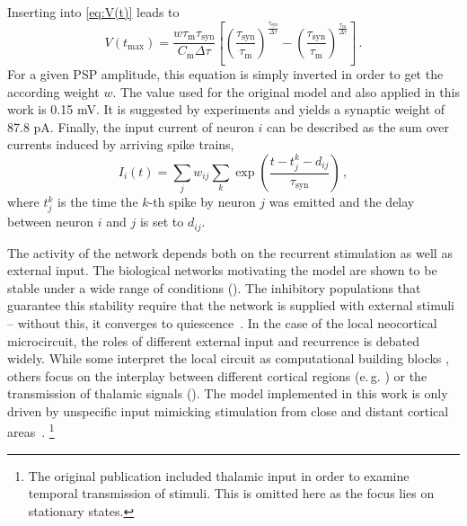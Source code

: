 Inserting into \autoref{eq:V(t)} leads to 
\begin{equation}
    V(t_\text{max}) 
        = \frac{w \tau_\text{m} \tau_\text{syn}}{C_\text{m} \Delta\tau}	
            \left[ 
                \left( \frac{\tau_\text{syn}}{\tau_\text{m}} \right)^\frac{\tau_\text{syn}}{\Delta\tau} 
            - \left( \frac{\tau_\text{syn}}{\tau_\text{m}} \right)^\frac{\tau_\text{m}}{\Delta\tau} 
            \right] \,.
    \label{eq:PSP}
\end{equation}
For a given PSP amplitude, this equation is simply inverted in order to get the according 
weight $w$. The value used for the original model and also applied in this work 
is 0.15 mV. It is suggested by experiments and yields 
a synaptic weight of 87.8 pA. 
Finally, the 
input current of neuron $i$ can be described as the sum over currents induced by
arriving spike trains, 
\begin{equation}
    I_i(t) = \sum_j w_{ij} \sum_k \exp\left(\frac{t - t_j^k - d_{ij}}{\tau_\text{syn}}\right) \, ,
    \label{eq:input_current}
\end{equation}
where $t_j^k$ is the time the $k$-th spike by neuron $j$ was emitted and the 
delay between neuron $i$ and $j$ is set to $d_{ij}$. 

The activity of the network depends both on the recurrent stimulation as well as 
external input. The biological networks motivating the model are shown to be 
stable under a wide range of conditions (). 
The inhibitory populations that guarantee this stability require that the network 
is supplied with external stimuli -- without this, it converges to quiescence~\cite{brunel2000}.
In the case of the local neocortical microcircuit, the roles of different
external input and recurrence is debated widely. While some interpret the local circuit
as computational building blocks \cite{potjans2014}, others focus on the interplay between 
different cortical regions (e.\,g. ) or the transmission of 
thalamic signals (). The model implemented in this work is only driven 
by unspecific input mimicking stimulation from close and distant cortical areas~\cite{potjans2014}.%
\footnote{
The original publication included thalamic input in order to examine temporal transmission 
of stimuli. This is omitted here as the focus lies on stationary states. 
}

